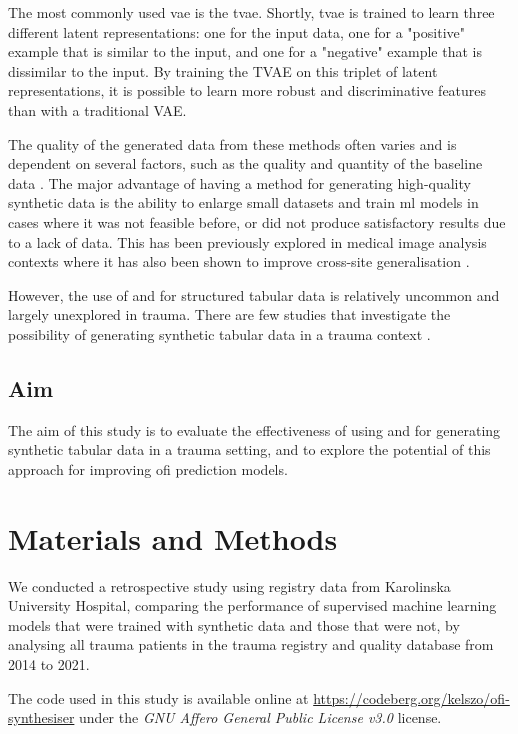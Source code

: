 \documentclass[12pt, a4paper]{article}
\begin{document}
The most commonly used \acrshort{vae} is the \acrfull{tvae}. Shortly, \acrshort{tvae} is trained to learn three
different latent representations: one for the input data, one for a "positive" example that is similar to the input,
and one for a "negative" example that is dissimilar to the input. By training the TVAE on this triplet of latent
representations, it is possible to learn more robust and discriminative features than with a traditional VAE.
\cite{ishfaq_tvae_2018}

The quality of the generated data from these methods often varies and is dependent on several factors, such as the
quality and quantity of the baseline data \cite{karras_training_2020}. The major advantage of having a method for
generating high-quality synthetic data is the ability to enlarge small datasets and train \acrshort{ml} models in cases
where it was not feasible before, or did not produce satisfactory results due to a lack of data. This has been
previously explored in medical image analysis contexts where it has also been shown to improve cross-site
generalisation \cite{sanaat_robust-deep_2022, bashyam_deep_2022}.

However, the use of  and  for structured tabular data is relatively uncommon and
largely unexplored in trauma. There are few studies that investigate the possibility of generating synthetic tabular
data in a trauma context \cite{hernandez_synthetic_2022}.

\subsection{Aim}
The aim of this study is to evaluate the effectiveness of using  and  for generating
synthetic tabular data in a trauma setting, and to explore the potential of this approach for improving \acrshort{ofi}
prediction models.

\section{Materials and Methods}
We conducted a retrospective study using registry data from Karolinska University Hospital, comparing the performance
of supervised machine learning models that were trained with synthetic data and those that were not, by analysing all
trauma patients in the trauma registry and quality database from 2014 to 2021.

The code used in this study is available online at \url{https://codeberg.org/kelszo/ofi-synthesiser} under the
\textit{GNU Affero General Public License v3.0} license.
\end{document}
